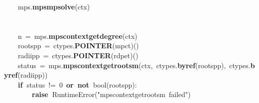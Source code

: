 \documentclass{article}\usepackage[]{graphicx}\usepackage[dvipsnames,table]{xcolor}
\makeatletter
\newcommand{\hlnum}[1]{\textcolor[rgb]{0.686,0.059,0.569}{#1}}%
\newcommand{\hlsng}[1]{\textcolor[rgb]{0.192,0.494,0.8}{#1}}%
\newcommand{\hlopt}[1]{\textcolor[rgb]{0,0,0}{#1}}%
\newcommand{\hldef}[1]{\textcolor[rgb]{0.345,0.345,0.345}{#1}}%
\newcommand{\hlkwa}[1]{\textcolor[rgb]{0.161,0.373,0.58}{\textbf{#1}}}%
\newcommand{\hlkwb}[1]{\textcolor[rgb]{0.69,0.353,0.396}{#1}}%
\newcommand{\hlkwc}[1]{\textcolor[rgb]{0.333,0.667,0.333}{#1}}%
\newcommand{\hlkwd}[1]{\textcolor[rgb]{0.737,0.353,0.396}{\textbf{#1}}}%
\newenvironment{kframe}{%
 \def\at@end@of@kframe{}%
 \ifinner\ifhmode%
  \def\at@end@of@kframe{\end{minipage}}%
  \begin{minipage}{\columnwidth}%
 \fi\fi%
 \def\FrameCommand##1{\hskip\@totalleftmargin \hskip-\fboxsep
 \colorbox{shadecolor}{##1}\hskip-\fboxsep
     \hskip-\linewidth \hskip-\@totalleftmargin \hskip\columnwidth}%
 \MakeFramed {\advance\hsize-\width
   \@totalleftmargin\z@ \linewidth\hsize
   \@setminipage}}%
 {\par\unskip\endMakeFramed%
 \at@end@of@kframe}
\newenvironment{knitrout}{}{} %
\makeatother
\begin{document}
\begin{center}
\begin{minipage}[m]{18cm}
\begin{knitrout}
\begin{kframe}
\hldef{}\hldef{\ \ \ \ }\hldef{\textunderscore mps}\hlopt{.}\hldef{}\hlkwd{mps\textunderscore mpsolve}\hldef{}\hlopt{(}\hldef{ctx}\hlopt{)}\hspace*{\fill}\\
\hldef{}\hspace*{\fill}\\
\hldef{}\hldef{\ \ \ \ }\hldef{}\hspace*{\fill}\\
\hldef{}\hldef{\ \ \ \ }\hldef{n\ }\hlopt{=\ }\hldef{\textunderscore mps}\hlopt{.}\hldef{}\hlkwd{mps\textunderscore context\textunderscore get\textunderscore degree}\hldef{}\hlopt{(}\hldef{ctx}\hlopt{)}\hspace*{\fill}\\
\hldef{}\hldef{\ \ \ \ }\hldef{roots\textunderscore pp\ }\hlopt{=\ }\hldef{ctypes}\hlopt{.}\hldef{}\hlkwd{POINTER}\hldef{}\hlopt{(}\hldef{mpc\textunderscore t}\hlopt{)()\ }\hldef{}\hspace*{\fill}\\
\hldef{}\hldef{\ \ \ \ }\hldef{radii\textunderscore pp\ }\hlopt{=\ }\hldef{ctypes}\hlopt{.}\hldef{}\hlkwd{POINTER}\hldef{}\hlopt{(}\hldef{rdpe\textunderscore t}\hlopt{)()\ }\hldef{}\hspace*{\fill}\\
\hldef{}\hldef{\ \ \ \ }\hldef{status\ }\hlopt{=\ }\hldef{\textunderscore mps}\hlopt{.}\hldef{}\hlkwd{mps\textunderscore context\textunderscore get\textunderscore roots\textunderscore m}\hldef{}\hlopt{(}\hldef{ctx}\hlopt{,\ }\hldef{ctypes}\hlopt{.}\hldef{}\hlkwd{byref}\hldef{}\hlopt{(}\hldef{roots\textunderscore pp}\hlopt{),\ }\hldef{ctypes}\hlopt{.}\hldef{}\hlkwd{byref}\hldef{}\hlopt{(}\hldef{radii\textunderscore pp}\hlopt{))}\hspace*{\fill}\\
\hldef{}\hldef{\ \ \ \ }\hldef{}\hlkwa{if\ }\hldef{status\ }\hlopt{!=\ }\hldef{}\hlnum{0\ }\hldef{}\hlkwa{or\ not\ }\hldef{}\hlkwb{bool}\hldef{}\hlopt{(}\hldef{roots\textunderscore pp}\hlopt{):\ }\hspace*{\fill}\\
\hldef{}\hldef{\ \ \ \ \ \ \ \ }\hldef{}\hlkwa{raise\ }\hldef{}\hlkwc{RuntimeError}\hldef{}\hlopt{(}\hldef{}\hlsng{"mps\textunderscore context\textunderscore get\textunderscore roots\textunderscore m\ failed"}\hldef{}\hlopt{)}\hspace*{\fill}\\
\hldef{}\hldef{\ \ \ \ \ \ \ \ }\hldef{}\hspace*{\fill}\\

\end{kframe}
\end{knitrout}
\end{minipage}
\end{center}
\end{document}
